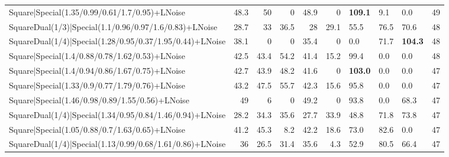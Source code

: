 \begin{tabular}{lrrrrrlllr}
 Square|Special(1.35/0.99/0.61/1.7/0.95)+LNoise                  &            48.3 &            50   &             0   &            48.9 &            0   & \textbf{109.1}  & 9.1            & 0.0            &           49 \\
 SquareDual(1/3)|Special(1.1/0.96/0.97/1.6/0.83)+LNoise          &            28.7 &            33   &            36.5 &            28   &           29.1 & 55.5            & 76.5           & 70.6           &           48 \\
 SquareDual(1/4)|Special(1.28/0.95/0.37/1.95/0.44)+LNoise        &            38.1 &             0   &             0   &            35.4 &            0   & 0.0             & 71.7           & \textbf{104.3} &           48 \\
 Square|Special(1.4/0.88/0.78/1.62/0.53)+LNoise                  &            42.5 &            43.4 &            54.2 &            41.4 &           15.2 & 99.4            & 0.0            & 0.0            &           48 \\
 Square|Special(1.4/0.94/0.86/1.67/0.75)+LNoise                  &            42.7 &            43.9 &            48.2 &            41.6 &            0   & \textbf{103.0}  & 0.0            & 0.0            &           47 \\
 Square|Special(1.33/0.9/0.77/1.79/0.76)+LNoise                  &            43.2 &            47.5 &            55.7 &            42.3 &           15.6 & 95.8            & 0.0            & 0.0            &           47 \\
 Square|Special(1.46/0.98/0.89/1.55/0.56)+LNoise                 &            49   &             6   &             0   &            49.2 &            0   & 93.8            & 0.0            & 68.3           &           47 \\
 SquareDual(1/4)|Special(1.34/0.95/0.84/1.46/0.94)+LNoise        &            28.2 &            34.3 &            35.6 &            27.7 &           33.9 & 48.8            & 71.8           & 73.8           &           47 \\
 Square|Special(1.05/0.88/0.7/1.63/0.65)+LNoise                  &            41.2 &            45.3 &             8.2 &            42.2 &           18.6 & 73.0            & 82.6           & 0.0            &           47 \\
 SquareDual(1/4)|Special(1.13/0.99/0.68/1.61/0.86)+LNoise        &            36   &            26.5 &            31.4 &            35.6 &            4.3 & 52.9            & 80.5           & 66.4           &           47 \\

\end{tabular}
